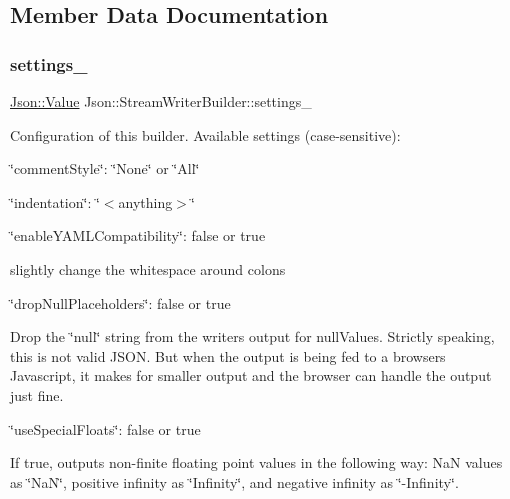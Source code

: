 \subsection{Member Data Documentation}
\mbox{\label{class_json_1_1_stream_writer_builder_a79bdf2e639a52f4e758c0b95bd1d3423}} 
\subsubsection{\texorpdfstring{settings\+\_\+}{settings\_}}
{\footnotesize\ttfamily \hyperlink{class_json_1_1_value}{Json\+::\+Value} Json\+::\+Stream\+Writer\+Builder\+::settings\+\_\+}

Configuration of this builder. Available settings (case-\/sensitive)\+:
\begin{DoxyItemize}
\item \char`\"{}comment\+Style\char`\"{}\+: \char`\"{}\+None\char`\"{} or \char`\"{}\+All\char`\"{}
\item \char`\"{}indentation\char`\"{}\+: \char`\"{}$<$anything$>$\char`\"{}
\item \char`\"{}enable\+Y\+A\+M\+L\+Compatibility\char`\"{}\+: false or true
\begin{DoxyItemize}
\item slightly change the whitespace around colons
\end{DoxyItemize}
\item \char`\"{}drop\+Null\+Placeholders\char`\"{}\+: false or true
\begin{DoxyItemize}
\item Drop the \char`\"{}null\char`\"{} string from the writer\textquotesingle{}s output for null\+Values. Strictly speaking, this is not valid J\+S\+ON. But when the output is being fed to a browser\textquotesingle{}s Javascript, it makes for smaller output and the browser can handle the output just fine.
\end{DoxyItemize}
\item \char`\"{}use\+Special\+Floats\char`\"{}\+: false or true
\begin{DoxyItemize}
\item If true, outputs non-\/finite floating point values in the following way\+: NaN values as \char`\"{}\+Na\+N\char`\"{}, positive infinity as \char`\"{}\+Infinity\char`\"{}, and negative infinity as \char`\"{}-\/\+Infinity\char`\"{}.
\end{DoxyItemize}
\end{DoxyItemize}

